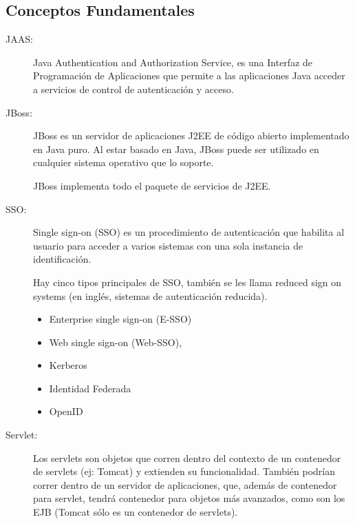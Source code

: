 
\subsection{Conceptos Fundamentales}
\begin{description}
	\item[JAAS:]
Java Authentication and Authorization Service, es una Interfaz de Programación de Aplicaciones que permite a las
aplicaciones Java acceder a servicios de control de autenticación y acceso.
	\item[JBoss:]
JBoss es un servidor de aplicaciones J2EE de código abierto implementado en
Java puro. Al estar basado en Java, JBoss puede ser utilizado en cualquier
sistema operativo que lo soporte.

JBoss implementa todo el paquete de servicios de J2EE.


	\item[SSO:]
Single sign-on (SSO) es un procedimiento de autenticación que habilita al
usuario para acceder a varios sistemas con una sola instancia de
identificación.

Hay cinco tipos principales de SSO, también se les llama reduced sign on
systems (en inglés, sistemas de autenticación reducida).
\begin{itemize}
	\item Enterprise single sign-on (E-SSO)
	\item Web single sign-on (Web-SSO),
	\item Kerberos
	\item Identidad Federada
	\item OpenID
\end{itemize}
\item[Servlet:] Los servlets son objetos que corren dentro del contexto de un
contenedor de servlets (ej: Tomcat) y extienden su funcionalidad. También
podrían correr dentro de un servidor de aplicaciones, que, además de
contenedor para servlet, tendrá contenedor para objetos más avanzados, como
son los EJB (Tomcat sólo es un contenedor de servlets).

\end{description}

